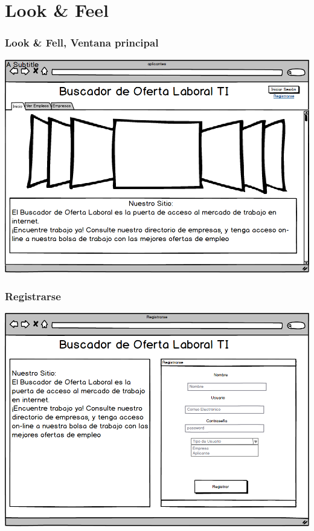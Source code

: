 \section{Look \& Feel}
\frame
{
  \frametitle{ Look \& Fell, Ventana principal}
  \begin{center}
		\includegraphics[scale=0.28]{./resources/02principal.png}
  \end{center}
}


\frame
{
  \frametitle{Registrarse}
  \begin{center}
		\includegraphics[scale=0.28]{./resources/01registrar.png}
  \end{center}
}

